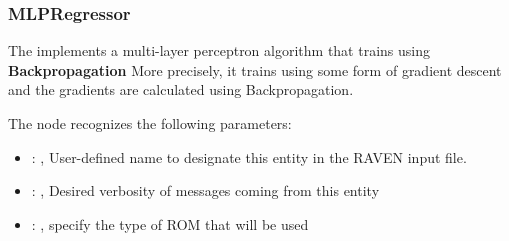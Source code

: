 \subsubsection{MLPRegressor}
  The  implements a multi-layer perceptron algorithm that trains using
  \textbf{Backpropagation}                             More precisely, it trains using some form of
  gradient descent and the gradients are calculated using Backpropagation.

  The  node recognizes the following parameters:
    \begin{itemize}
      \item {}: , 
        User-defined name to designate this entity in the RAVEN input file.
      \item {}: , 
        Desired verbosity of messages coming from this entity
      \item {}: , 
        specify the type of ROM that will be used
  \end{itemize}

